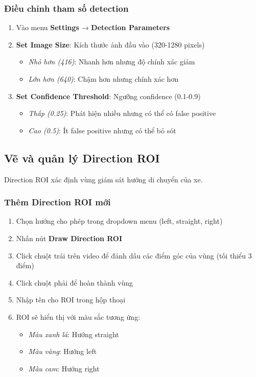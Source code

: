 \subsubsection{Điều chỉnh tham số detection}
\begin{enumerate}
    \item Vào menu \textbf{Settings} → \textbf{Detection Parameters}
    \item \textbf{Set Image Size}: Kích thước ảnh đầu vào (320-1280 pixels)
    \begin{itemize}
        \item \textit{Nhỏ hơn (416)}: Nhanh hơn nhưng độ chính xác giảm
        \item \textit{Lớn hơn (640)}: Chậm hơn nhưng chính xác hơn
    \end{itemize}
    \item \textbf{Set Confidence Threshold}: Ngưỡng confidence (0.1-0.9)
    \begin{itemize}
        \item \textit{Thấp (0.25)}: Phát hiện nhiều nhưng có thể có false positive
        \item \textit{Cao (0.5)}: Ít false positive nhưng có thể bỏ sót
    \end{itemize}
\end{enumerate}

\subsection{Vẽ và quản lý Direction ROI}

Direction ROI xác định vùng giám sát hướng di chuyển của xe.

\subsubsection{Thêm Direction ROI mới}
\begin{enumerate}
    \item Chọn hướng cho phép trong dropdown menu (left, straight, right)
    \item Nhấn nút \textbf{Draw Direction ROI}
    \item Click chuột trái trên video để đánh dấu các điểm góc của vùng (tối thiểu 3 điểm)
    \item Click chuột phải để hoàn thành vùng
    \item Nhập tên cho ROI trong hộp thoại
    \item ROI sẽ hiển thị với màu sắc tương ứng:
    \begin{itemize}
        \item \textit{Màu xanh lá}: Hướng straight
        \item \textit{Màu vàng}: Hướng left
        \item \textit{Màu cam}: Hướng right
    \end{itemize}
\end{enumerate}

